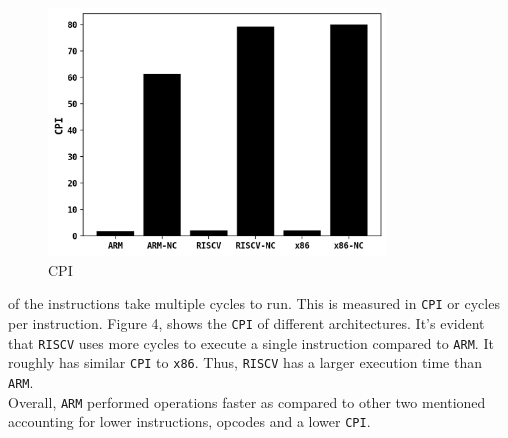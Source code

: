 \begin{figure}[H]
    \centering
    \includegraphics[width=0.8\textwidth]{./figs/4.png}
    \caption{CPI}
    \label{fig:CPI}
\end{figure}
of the instructions take multiple cycles to run. This is measured in \texttt{CPI} or cycles per 
instruction. Figure 4, shows the \texttt{CPI} of different architectures. It's evident that \texttt{RISCV}
uses more cycles to execute a single instruction compared to \texttt{ARM}. It roughly has similar \texttt{CPI}
to \texttt{x86}. Thus, \texttt{RISCV} has a larger execution time than \texttt{ARM}.\\
Overall, \texttt{ARM} performed operations faster as compared to other two mentioned accounting for lower instructions,
opcodes and a lower \texttt{CPI}. 

